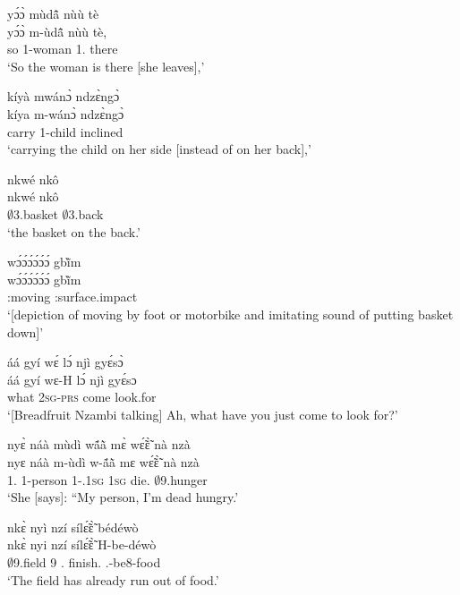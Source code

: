 \begin{exe}[(N234)]
\exN\label{n34} 
  \glll  yɔ́ɔ̀ mùdã̂ nùù tè \\
         yɔ́ɔ̀ m-ùdã̂ nùù tè, \\
          so {\N}1-woman 1.{\COP} there \\
    \trans `So the woman is there [she leaves],'
 
\exN\label{n35}
  \glll  kíyà mwánɔ̀ ndzɛ̀ngɔ̀  \\
        kíya m-wánɔ̀ ndzɛ̀ngɔ̀ \\
          carry {\N}1-child inclined    \\
    \trans `carrying the child on her side [instead of on her back],'
 
\exN\label{n36}
  \glll nkwé nkô \\
         nkwé nkô \\
          $\emptyset$3.basket $\emptyset$3.back \\
    \trans `the basket on the back.'
 
\exN\label{n37}
  \glll  wɔ́ɔ́ɔ́ɔ́ɔ́ɔ́ gbĩ̀m  \\
           wɔ́ɔ́ɔ́ɔ́ɔ́ɔ́ gbĩ̀m  \\
            {\IDEO}:moving {\IDEO}:surface.impact  \\
    \trans `[depiction of moving by foot or motorbike and imitating sound of putting basket down]'
 
\exN\label{n38}
  \glll  áá gyí wɛ́ lɔ́ njì gyɛ́sɔ̀ \\
        áá gyí wɛ-H lɔ́ njì gyɛ́sɔ \\
           {\EXCL} what 2\textsc{sg}-\textsc{prs} {\RETRO}  come look.for  \\
    \trans `[Breadfruit Nzambi talking] Ah, what have you just come to look for?'
 
\exN\label{n39} 
  \glll  nyɛ̀ náà mùdì wã́ã̀ mɛ̀ wɛ̃́ɛ̃̀ nà nzà \\
         nyɛ náà m-ùdì w-ã́ã̀ mɛ wɛ̃́ɛ̃̀ nà nzà \\
           1.{\SBJ}  {\COMP} {\N}1-person 1-{\POSS}.1\textsc{sg} 1\textsc{sg} die.{\COMPL} {\COM} $\emptyset$9.hunger\\
    \trans `She [says]: ``My person, I'm dead hungry.'
 
\exN\label{n40}
  \glll nkɛ̀ nyì nzí sílɛ̃́ɛ̃̀ bédéwò \\
          nkɛ̀ nyi nzí sílɛ̃́ɛ̃̀ H-be-déwò \\
          $\emptyset$9.field 9 {\PROG}.{\PST}  finish.{\COMPL} {\OBJ}.{\LINK}-be8-food   \\
    \trans `The field has already run out of food.'
 

\end{exe}
